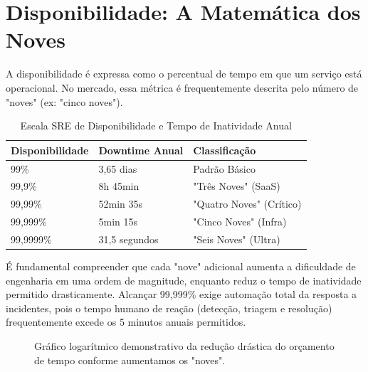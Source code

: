 \documentclass[12pt,a4paper]{report}
\begin{document}
\section{Disponibilidade: A Matemática dos Noves}

A disponibilidade é expressa como o percentual de tempo em que um serviço está operacional. No mercado, essa métrica é frequentemente descrita pelo número de "noves" (ex: "cinco noves"). 

\begin{table}[h!]
\centering
\caption{Escala SRE de Disponibilidade e Tempo de Inatividade Anual}
\begin{tabular}{@{}lll@{}}
\toprule
\textbf{Disponibilidade} & \textbf{Downtime Anual} & \textbf{Classificação} \\ \midrule
99\%                     & 3,65 dias              & Padrão Básico          \\
99,9\%                   & 8h 45min               & "Três Noves" (SaaS)    \\
99,99\%                  & 52min 35s              & "Quatro Noves" (Crítico)\\
99,999\%                 & 5min 15s               & "Cinco Noves" (Infra)  \\
99,9999\%                & 31,5 segundos          & "Seis Noves" (Ultra)   \\ \bottomrule
\end{tabular}
\end{table}

É fundamental compreender que cada "nove" adicional aumenta a dificuldade de engenharia em uma ordem de magnitude, enquanto reduz o tempo de inatividade permitido drasticamente. Alcançar 99,999\% exige automação total da resposta a incidentes, pois o tempo humano de reação (detecção, triagem e resolução) frequentemente excede os 5 minutos anuais permitidos.

\begin{figure}[h]
    \centering
    \caption{Gráfico logarítmico demonstrativo da redução drástica do orçamento de tempo conforme aumentamos os "noves".}
\end{figure}
\end{document}
